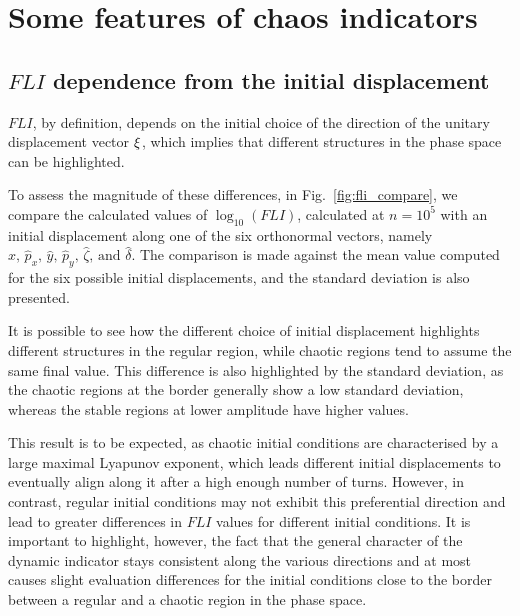 \section{Some features of chaos indicators}

\subsection{$FLI$ dependence from the initial displacement}

$FLI$, by definition, depends on the initial choice of the direction of the unitary displacement vector $\vb{\xi}$, which implies that  different structures in the phase space can be highlighted.

To assess the magnitude of these differences, in Fig.~\ref{fig:fli_compare}, we compare the calculated values of $\log_{10}({FLI})$, calculated at $n=10^5$ with an initial displacement along one of the six orthonormal vectors, namely $\hat{x},\,\hat{p}_x,\,\hat{y},\,\hat{p}_y,\,\hat{\zeta},\,\text{and }\hat{\delta}$. The comparison is made against the mean value computed for the six possible initial displacements, and the standard deviation is also presented.

It is possible to see how the different choice of initial displacement highlights different structures in the regular region, while chaotic regions tend to assume the same final value. This difference is also highlighted by the standard deviation, as the chaotic regions at the border generally show a low standard deviation, whereas the stable regions at lower amplitude have higher values.

This result is to be expected, as chaotic initial conditions are characterised by a large maximal Lyapunov exponent, which leads different initial displacements to eventually align along it after a high enough number of turns. However, in contrast, regular initial conditions may not exhibit this preferential direction and lead to greater differences in $FLI$ values for different initial conditions. It is important to highlight, however, the fact that the general character of the dynamic indicator stays consistent along the various directions and at most causes slight evaluation differences for the initial conditions close to the border between a regular and a chaotic region in the phase space.

